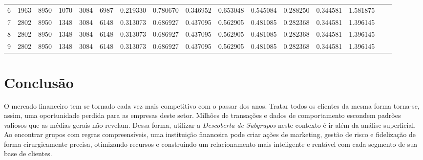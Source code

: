 \documentclass[12pt]{article}
\begin{document}
\begin{table}
{\begin{tabular}{lrlrrrrrrrrrrrrr}
            6        & 1963          & 8950          & 1070               & 3084             & 6987               & 0.219330                   & 0.780670     & 0.346952             & 0.653048          & 0.545084                  & 0.288250               & 0.344581 & 1.581875 \\
            7        & 2802          & 8950          & 1348               & 3084             & 6148               & 0.313073                   & 0.686927     & 0.437095             & 0.562905          & 0.481085                  & 0.282368               & 0.344581 & 1.396145 \\
            8        & 2802          & 8950          & 1348               & 3084             & 6148               & 0.313073                   & 0.686927     & 0.437095             & 0.562905          & 0.481085                  & 0.282368               & 0.344581 & 1.396145 \\
            9        & 2802          & 8950          & 1348               & 3084             & 6148               & 0.313073                   & 0.686927     & 0.437095             & 0.562905          & 0.481085                  & 0.282368               & 0.344581 & 1.396145 \\
            \bottomrule
        \end{tabular}
    }
\end{table}

\section{Conclusão}

\hspace{1.2cm}O mercado financeiro tem se tornado cada vez mais competitivo com o passar dos anos. Tratar todos os clientes da mesma forma torna-se, assim, uma oportunidade perdida para as empresas deste setor. Milhões de transações e dados de comportamento escondem padrões valiosos que as médias gerais não revelam. Dessa forma, utilizar a \textit{Descoberta de Subgrupos} neste contexto é ir além da análise superficial. Ao encontrar grupos com regras compreensíveis, uma instituição financeira pode criar ações de marketing, gestão de risco e fidelização de forma cirurgicamente precisa, otimizando recursos e construindo um relacionamento mais inteligente e rentável com cada segmento de sua base de clientes.
\end{document}
